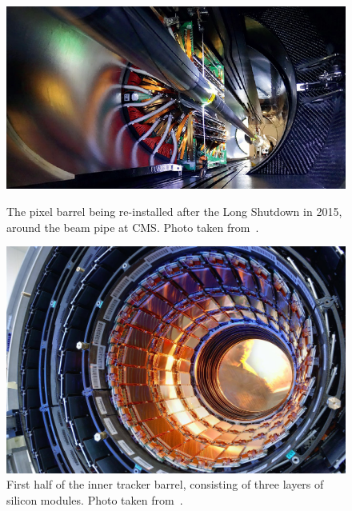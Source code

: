        \begin{figure}[htbp]
 	\centering
 	\begin{minipage}[t]{0.5\linewidth}
 		\includegraphics[width=\linewidth]{2_ExperimentalSetup/Figures/cmspixel}
 		\caption{The pixel barrel being re-installed after the Long Shutdown in 2015, around the beam pipe at CMS. Photo taken from~\cite{Christine:2024986}.}
 		\label{fig:pix}
 	\end{minipage}
 	\hfill
 	\begin{minipage}[t]{0.4\linewidth}
 		\includegraphics[width=\linewidth]{2_ExperimentalSetup/Figures/cmsbarrel}
 		\caption{First half of the inner tracker barrel, consisting of three layers of silicon modules. Photo taken from~\cite{beautiful:1998635}.}
 		\label{fig:Trackpics}
 	\end{minipage}
 	
 \end{figure}
 
